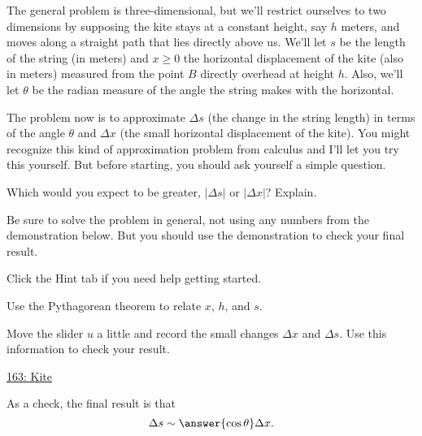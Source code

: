 \documentclass{ximera}
\begin{document}
\begin{question}  \label{Q:09df0g4444e}
The general problem is three-dimensional, but we'll restrict ourselves to two dimensions by supposing the kite stays at a constant height, say $h$ meters, and moves along a straight path that lies directly above us. We'll let $s$ be the length of the string (in meters) and $x\geq 0$ the horizontal displacement of the kite (also in meters) measured from the point $B$ directly overhead at height $h$. Also, we'll let $\theta$ be the radian measure of the angle the string makes with the horizontal.

The problem now is to approximate $\Delta s$ (the change in the string length) in terms of the angle $\theta$ and $\Delta x$ (the small horizontal displacement of the kite). You might recognize this kind of approximation problem from calculus and I'll let you try this yourself. But before starting, you should ask yourself a simple question. 

\begin{freeResponse}
Which would you expect to be greater, $|\Delta s|$ or $|\Delta x|$? Explain.
\end{freeResponse}

Be sure to solve the problem in general, not using any numbers from the demonstration below. But you should use the demonstration to check your final result.

Click the Hint tab if you need help getting started.

\begin{hint}
Use the Pythagorean theorem to relate $x$, $h$, and $s$. 
\end{hint} 

Move the slider $u$ a little and record the small changes $\Delta x$ and $\Delta s$. Use this information to check your result. 
\begin{onlineOnly}
    \begin{center}
\end{center}
\end{onlineOnly}

\href{https://www.desmos.com/calculator/7yad8xxxt8}{163: Kite}

As a check, the final result is that
\[
    \Delta s \sim \answer{\cos\theta} \Delta x .
\]

\end{question}
\end{document}
